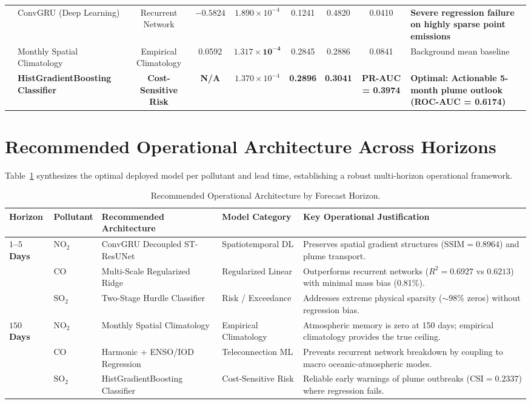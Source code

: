 ﻿\documentclass[10pt,a4paper]{article}
\begin{document}
\begin{table}[htbp]
\begin{tabularx}{\textwidth}{llccccccX}
& ConvGRU (Deep Learning) & Recurrent Network & $\mathbf{-0.5824}$ & $1.890 \times 10^{-4}$ & 0.1241 & 0.4820 & 0.0410 & \textbf{Severe regression failure on highly sparse point emissions} \\
& Monthly Spatial Climatology & Empirical Climatology & 0.0592 & $\mathbf{1.317 \times 10^{-4}}$ & 0.2845 & 0.2886 & 0.0841 & Background mean baseline \\
& \textbf{HistGradientBoosting Classifier} & \textbf{Cost-Sensitive Risk} & \textbf{N/A} & $1.370 \times 10^{-4}$ & \textbf{0.2896} & \textbf{0.3041} & \textbf{PR-AUC = 0.3974} & \textbf{Optimal: Actionable 5-month plume outlook (ROC-AUC = 0.6174)} \\
\bottomrule
\end{tabularx}
\end{table}

\vspace{0.8em}
\section{Recommended Operational Architecture Across Horizons}
Table~\ref{tab:champion} synthesizes the optimal deployed model per pollutant and lead time, establishing a robust multi-horizon operational framework.

\begin{table}[htbp]
\centering
\small
\caption{Recommended Operational Architecture by Forecast Horizon.}
\label{tab:champion}
\begin{tabularx}{\textwidth}{llllX}
\toprule
\textbf{Horizon} & \textbf{Pollutant} & \textbf{Recommended Architecture} & \textbf{Model Category} & \textbf{Key Operational Justification} \\
\midrule
\multirow{3}{*}{\textbf{$1$--$5$ Days}} 
& $\text{NO}_2$ & ConvGRU Decoupled ST-ResUNet & Spatiotemporal DL & Preserves spatial gradient structures ($\text{SSIM} = 0.8964$) and plume transport. \\
& $\text{CO}$ & Multi-Scale Regularized Ridge & Regularized Linear & Outperforms recurrent networks ($R^2 = 0.6927$ vs $0.6213$) with minimal mass bias (0.81\%). \\
& $\text{SO}_2$ & Two-Stage Hurdle Classifier & Risk / Exceedance & Addresses extreme physical sparsity ($\sim 98\%$ zeros) without regression bias. \\
\midrule
\multirow{3}{*}{\textbf{$150$ Days}} 
& $\text{NO}_2$ & Monthly Spatial Climatology & Empirical Climatology & Atmospheric memory is zero at 150 days; empirical climatology provides the true ceiling. \\
& $\text{CO}$ & Harmonic + ENSO/IOD Regression & Teleconnection ML & Prevents recurrent network breakdown by coupling to macro oceanic-atmospheric modes. \\
& $\text{SO}_2$ & HistGradientBoosting Classifier & Cost-Sensitive Risk & Reliable early warnings of plume outbreaks ($\text{CSI} = 0.2337$) where regression fails. \\
\bottomrule
\end{tabularx}
\end{table}
\end{document}
